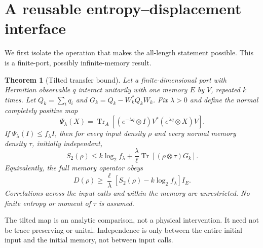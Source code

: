 \documentclass[11pt]{article}
\newtheorem{theorem}{Theorem}[section]
\newcommand{\Tr}{\operatorname{Tr}}
\begin{document}
\section{A reusable entropy--displacement interface}

We first isolate the operation that makes the all-length statement
possible. This is a finite-port, possibly infinite-memory result.

\begin{theorem}[Tilted transfer bound]\label{thm:general}
Let a finite-dimensional port with Hermitian observable \(q\) interact
unitarily with one memory \(E\) by \(V\), repeated \(k\) times.
Let \(Q_k=\sum_iq_i\) and \(G_k=Q_k-W_k^*Q_kW_k\).
Fix \(\lambda>0\) and define the normal completely positive map
\[
 \Psi_\lambda(X)=
 \Tr_A[(e^{-\lambda q}\otimes I)V^*(e^{\lambda q}\otimes X)V].
\]
If \(\Psi_\lambda(I)\le f_\lambda I\), then for every input density
\(\rho\) and every normal memory density \(\tau\), initially independent,
\begin{equation}\label{eq:generalentropy}
 S_2(\rho)\le k\log_2 f_\lambda+
 \frac{\lambda}{\ell}\Tr[(\rho\otimes\tau)G_k].
\end{equation}
Equivalently, the full memory operator obeys
\begin{equation}\label{eq:generaloperator}
 D(\rho)\ge\frac{\ell}{\lambda}
       [S_2(\rho)-k\log_2 f_\lambda]I_E.
\end{equation}
Correlations across the input calls and within the memory are unrestricted.
No finite entropy or moment of \(\tau\) is assumed.
\end{theorem}

The tilted map is an analytic comparison, not a physical intervention.
It need not be trace preserving or unital. Independence is only between
the entire initial input and the initial memory, not between input calls.
\end{document}
